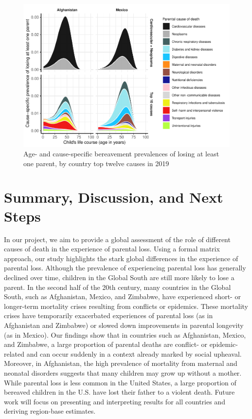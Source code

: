 \documentclass[
  11pt,
  letterpaper,
]{article}
\begin{document}
\begin{figure}
\centering
\includegraphics{parental_loss_global_paa_ext_abstract_files/figure-latex/ber-prob-1.pdf}
\caption{\label{fig:ber-prob}Age- and cause-specific bereavement prevalences of losing at least one parent, by country top twelve causes in 2019}
\end{figure}

\hypertarget{summary-discussion-and-next-steps}{%
\section{Summary, Discussion, and Next Steps}\label{summary-discussion-and-next-steps}}

In our project, we aim to provide a global assessment of the role of different causes of death in the experience of parental loss. Using a formal matrix approach, our study highlights the stark global differences in the experience of parental loss. Although the prevalence of experiencing parental loss has generally declined over time, children in the Global South are still more likely to lose a parent. In the second half of the 20th century, many countries in the Global South, such as Afghanistan, Mexico, and Zimbabwe, have experienced short- or longer-term mortality crises resulting from conflicts or epidemics. These mortality crises have temporarily exacerbated experiences of parental loss (as in Afghanistan and Zimbabwe) or slowed down improvements in parental longevity (as in Mexico). Our findings show that in countries such as Afghanistan, Mexico, and Zimbabwe, a large proportion of parental deaths are conflict- or epidemic-related and can occur suddenly in a context already marked by social upheaval. Moreover, in Afghanistan, the high prevalence of mortality from maternal and neonatal disorders suggests that many children may grow up without a mother. While parental loss is less common in the United States, a large proportion of bereaved children in the U.S. have lost their father to a violent death. Future work will focus on presenting and interpreting results for all countries and deriving region-base estimates.
\end{document}
